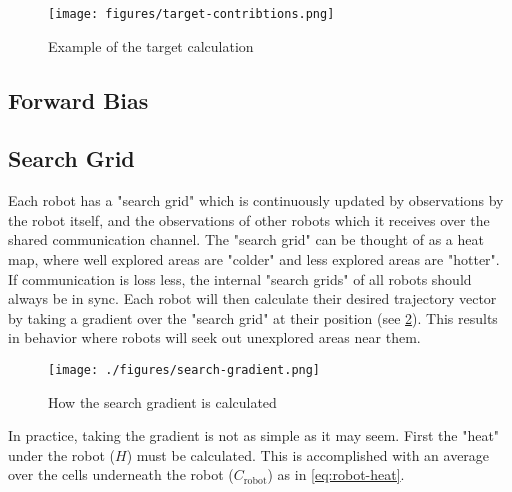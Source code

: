 \begin{figure}[H]
    \begin{center}
        \texttt{[image: figures/target-contribtions.png]}
    \end{center}
    \caption{Example of the target calculation}
    \label{fig:target-contributions}
\end{figure}




\subsection{Forward Bias}

\subsection{Search Grid}

Each robot has a "search grid" which is continuously updated by observations by the robot itself, and the observations of other robots which it receives over the shared communication channel. The "search grid" can be thought of as a heat map, where well explored areas are "colder" and less explored areas are "hotter". If communication is loss less, the internal "search grids" of all robots should always be in sync. Each robot will then calculate their desired trajectory vector by taking a gradient over the "search grid" at their position (see \cref{fig:search-gradient}). This results in behavior where robots will seek out unexplored areas near them. \\

\begin{figure}[h]
    \begin{center}
        \texttt{[image: ./figures/search-gradient.png]}
    \end{center}
    \caption{How the search gradient is calculated}
    \label{fig:search-gradient}
\end{figure}


In practice, taking the gradient is not as simple as it may seem. First the "heat" under the robot ($H$) must be calculated. This is accomplished with an average over the cells underneath the robot ($C_\mathrm{robot}$) as in \cref{eq:robot-heat}.

